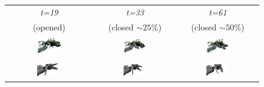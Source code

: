 \begin{figure}
\centering
\begin{tabular}{c:c:c}
\hline
\textit{t=19} & \textit{t=33} & \textit{t=61}\\
(opened) & (closed $\sim 25\%$) & (closed $\sim 50\%$)\\
\includegraphics[width=0.3\textwidth]{images/eval_vicon/sequence/finger_movement/obs_0.png} & \includegraphics[width=0.3\textwidth]{images/eval_vicon/sequence/finger_movement/obs_33.png} & \includegraphics[width=0.3\textwidth]{images/eval_vicon/sequence/finger_movement/obs_61.png} \\
\includegraphics[width=0.3\textwidth]{images/eval_vicon/sequence/finger_movement/rep_0.png} & \includegraphics[width=0.3\textwidth]{images/eval_vicon/sequence/finger_movement/rep_33.png} & \includegraphics[width=0.3\textwidth]{images/eval_vicon/sequence/finger_movement/rep_61.png} \\

\end{tabular}
\end{figure}
